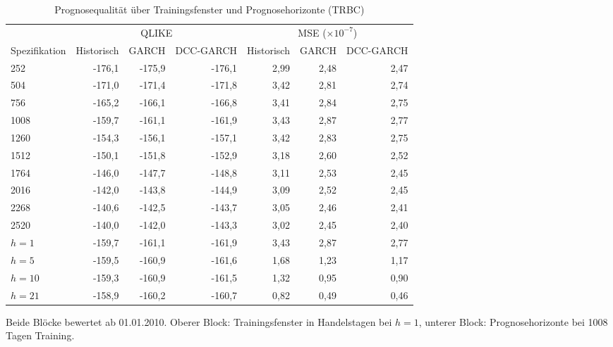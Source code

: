 \begin{table}[htbp]
  \centering
  \footnotesize
  \begin{tabular}{lrrrrrr}
    \toprule
    & \multicolumn{3}{c}{QLIKE} & \multicolumn{3}{c}{MSE ($\times 10^{-7}$)} \\
    \cmidrule(lr){2-4}\cmidrule(lr){5-7}
    Spezifikation & Historisch & GARCH & DCC-GARCH & Historisch & GARCH & DCC-GARCH \\
    \midrule
    252 & -176,1 & -175,9 & -176,1 & 2,99 & 2,48 & 2,47 \\
    504 & -171,0 & -171,4 & -171,8 & 3,42 & 2,81 & 2,74 \\
    756 & -165,2 & -166,1 & -166,8 & 3,41 & 2,84 & 2,75 \\
    1008 & -159,7 & -161,1 & -161,9 & 3,43 & 2,87 & 2,77 \\
    1260 & -154,3 & -156,1 & -157,1 & 3,42 & 2,83 & 2,75 \\
    1512 & -150,1 & -151,8 & -152,9 & 3,18 & 2,60 & 2,52 \\
    1764 & -146,0 & -147,7 & -148,8 & 3,11 & 2,53 & 2,45 \\
    2016 & -142,0 & -143,8 & -144,9 & 3,09 & 2,52 & 2,45 \\
    2268 & -140,6 & -142,5 & -143,7 & 3,05 & 2,46 & 2,41 \\
    2520 & -140,0 & -142,0 & -143,3 & 3,02 & 2,45 & 2,40 \\
    \midrule
    $h=1$ & -159,7 & -161,1 & -161,9 & 3,43 & 2,87 & 2,77 \\
    $h=5$ & -159,5 & -160,9 & -161,6 & 1,68 & 1,23 & 1,17 \\
    $h=10$ & -159,3 & -160,9 & -161,5 & 1,32 & 0,95 & 0,90 \\
    $h=21$ & -158,9 & -160,2 & -160,7 & 0,82 & 0,49 & 0,46 \\
    \bottomrule
  \end{tabular}
  \caption{Prognosequalität über Trainingsfenster und Prognosehorizonte (TRBC)}
  \label{tab:qlike_grid}
  \begin{minipage}{\linewidth}\vspace{0.4em}\centering\footnotesize
  Beide Blöcke bewertet ab 01.01.2010. Oberer Block: Trainingsfenster in Handelstagen bei $h=1$, unterer Block: Prognosehorizonte bei 1008 Tagen Training.
  \end{minipage}
\end{table}
